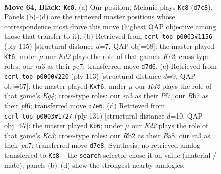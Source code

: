 \documentclass[11pt]{article}
\begin{document}
\clearpage

\begin{figure}[p]\centering
\begin{subfigure}{0.46\textwidth}\centering
\resizebox{\linewidth}{!}{%
\newchessgame
\chessboard[
  setfen={8/1b1k2R1/8/8/1P6/R7/1r6/6K1 b - - 2 64},
  showmover=false,
  pgfstyle=straightmove, color=movearrow, markmove={d7-c8}
]}
\caption{}
\end{subfigure}\hfill
\begin{subfigure}{0.46\textwidth}\centering
\resizebox{\linewidth}{!}{%
\newchessgame
\chessboard[
  setfen={8/2P1k2R/4b3/2r5/7K/8/8/8 b - - 4 58},
  showmover=false,
  pgfstyle=straightmove, color=movearrow, markmove={e7-f6}
]}
\caption{}
\end{subfigure}
\\[4pt]
\begin{subfigure}{0.46\textwidth}\centering
\resizebox{\linewidth}{!}{%
\newchessgame
\chessboard[
  setfen={8/5p2/5P2/3R2k1/8/3K4/r7/8 b - - 0 57},
  showmover=false,
  pgfstyle=straightmove, color=movearrow, markmove={g5-f6}
]}
\caption{}
\end{subfigure}\hfill
\begin{subfigure}{0.46\textwidth}\centering
\resizebox{\linewidth}{!}{%
\newchessgame
\chessboard[
  setfen={b7/P7/2k5/8/4r3/2R3K1/8/8 b - - 3 66},
  showmover=false,
  pgfstyle=straightmove, color=movearrow, markmove={c6-b6}
]}
\caption{}
\end{subfigure}
\caption{\textbf{Move 64, Black: \texttt{Kc8}.} (a) Our position; Melanie plays \texttt{Kc8} (\texttt{d7c8}). Panels (b)--(d) are the retrieved master positions whose correspondence most drove this move (highest QAP objective among those that transfer to it). (b) Retrieved from \texttt{ccrl\_top\_p0003\#1156} (ply 115) [structural distance $d$=7, QAP obj=68]: the master played \texttt{Kf6}; under $\mu$ our \emph{Kd2} plays the role of that game's \emph{Ke2}; cross-type roles: our \emph{r}a3 as their \emph{p}c7; transferred move \texttt{d7d6}. (c) Retrieved from \texttt{ccrl\_top\_p0000\#220} (ply 113) [structural distance $d$=9, QAP obj=67]: the master played \texttt{Kxf6}; under $\mu$ our \emph{Kd2} plays the role of that game's \emph{Kg4}; cross-type roles: our \emph{r}a3 as their \emph{P}f7, our \emph{B}b7 as their \emph{p}f6; transferred move \texttt{d7e6}. (d) Retrieved from \texttt{ccrl\_top\_p0003\#1727} (ply 131) [structural distance $d$=10, QAP obj=67]: the master played \texttt{Kb6}; under $\mu$ our \emph{Kd2} plays the role of that game's \emph{Kc3}; cross-type roles: our \emph{R}b2 as their \emph{B}a8, our \emph{r}a3 as their \emph{p}a7; transferred move \texttt{d7e8}. Synthesis: no retrieved analog transferred to \texttt{Kc8} -- the \texttt{search} selector chose it on value (material / mate); panels (b)--(d) show the strongest nearby analogies.}
\label{fig:thought-m127}
\end{figure}
\end{document}
